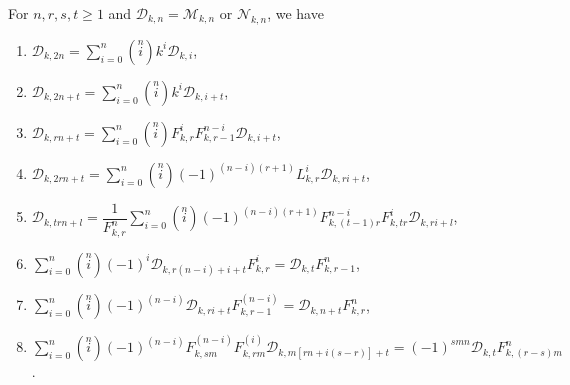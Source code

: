 \begin{theorem}For $n, r, s, t\geq 1$ and $\mathcal{D}_{k,n}=\mathcal{M}_{k,n}$ or $\mathcal{N}_{k,n}$, we have\label{3.3}
\begin{enumerate}
\item $\mathcal{D}_{k,2n}=\sum\limits_{i=0}^{n}\left( \stackrel{n}{i}\right) k^{i}\mathcal{D}_{k,i} $,
\item $\mathcal{D}_{k,2n+t}=\sum\limits_{i=0}^{n}\left( \stackrel{n}{i}\right) k^{i}\mathcal{D}_{k,i+t} $,
\item $\mathcal{D}_{k,rn+t}=\sum\limits_{i=0}^{n}\left( \stackrel{n}{i}\right) F_{k,r}^{i}F_{k,r-1}^{n-i}\mathcal{D}_{k,i+t} $,
\item $\mathcal{D}_{k,2rn+t}=\sum\limits_{i=0}^{n}\left( \stackrel{n}{i}\right)(-1)^{(n-i)(r+1)} L_{k,r}^{i}\mathcal{D}_{k,ri+t} $,
\item $\mathcal{D}_{k,trn+l}=\dfrac{1}{F_{k,r}^{n}}\sum\limits_{i=0}^{n}\left( \stackrel{n}{i}\right)(-1)^{(n-i)(r+1)} F_{k,(t-1)r}^{n-i}F_{k,tr}^{i}\mathcal{D}_{k,ri+l} $,
\item $\sum\limits_{i=0}^{n}\left( \stackrel{n}{i}\right)(-1)^{i} \mathcal{D}_{k,r(n-i)+i+t}F_{k,r}^{i}=\mathcal{D}_{k,t}F_{k,r-1}^{n} $,
\item $\sum\limits_{i=0}^{n}\left( \stackrel{n}{i}\right)(-1)^{(n-i)} \mathcal{D}_{k,ri+t}F_{k,r-1}^{(n-i)}=\mathcal{D}_{k,n+t}F_{k,r}^{n} $,
\item $\sum\limits_{i=0}^{n}\left( \stackrel{n}{i}\right)(-1)^{(n-i)}F_{k,sm}^{(n-i)}F_{k,rm}^{(i)} \mathcal{D}_{k,m[rn+i(s-r)]+t}=(-1)^{smn}\mathcal{D}_{k,t}F_{k,(r-s)m}^{n} $.
\end{enumerate}
\end{theorem}

